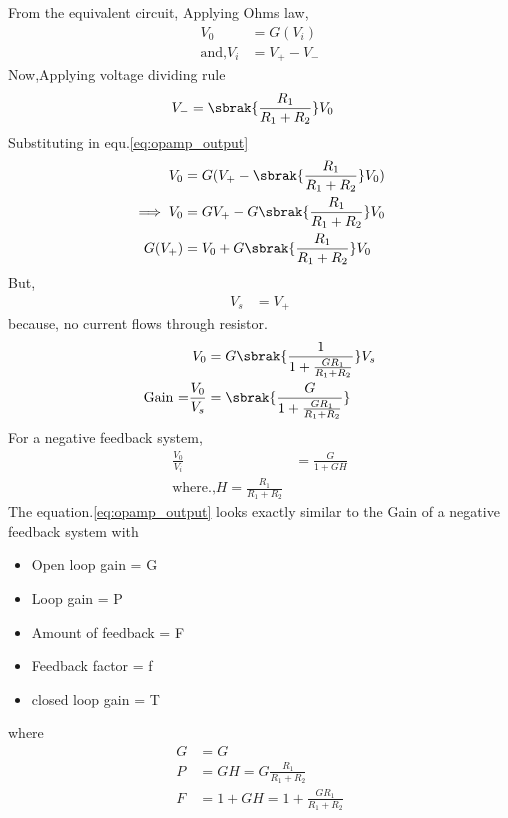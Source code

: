 \begin{enumerate}[label=\thesubsection.\arabic*.,ref=\thesubsection.\theenumi]
\begin{figure}[!ht]
\begin{center}
		\resizebox{\columnwidth}{!}{}
	\end{center}
\caption{}
\label{fig:equivalent_circuit}
\end{figure}
From the equivalent circuit,
Applying Ohms law,
\begin{align}
V_0 &= G(V_i) \label{eq:opamp_output}\\
\text{and,} V_i &= V_+-V_-
\end{align}
Now,Applying voltage dividing rule
\begin{align}
V_- &= \sbrak{\frac{R_1}{R_1+R_2}}V_0
\end{align}
Substituting in equ.\ref{eq:opamp_output}
\begin{align}
    V_0 &= G(V_+-\sbrak{\frac{R_1}{R_1+R_2}}V_0)
    \\
\implies V_0 &= GV_+-G\sbrak{\frac{R_1}{R_1+R_2}}V_0
    \\
G(V_+)&=V_0+G\sbrak{\frac{R_1}{R_1+R_2}}V_0
\end{align}
But,
\begin{align}
    V_s &= V_+
\end{align}
because, no current flows through resistor.  
\begin{align}
    V_0 &= G\sbrak{\frac{1}{1+\frac{GR_1}{R_1+R_2}}}V_s
    \\
 \text{Gain =}\frac{V_0}{V_s}&=\sbrak{\frac{G}{1+\frac{GR_1}{R_1+R_2}}}\label{eq:opamp_gain}
\end{align}
For a negative feedback system,
\begin{align}
   \frac{V_0}{V_i} &= \frac{G}{1+GH}
  \\
  \text{where.,} H = \frac{R_1}{R_1+R_2}
\end{align}
The equation.\ref{eq:opamp_output} looks exactly similar to the Gain of a negative feedback system with
\begin{itemize}
    \item Open loop gain = G
    \item Loop gain = P 
    \item Amount of feedback = F
    \item Feedback factor = f
    \item closed loop gain = T
\end{itemize}
where
\begin{align}
    G &= G\\
    P &= GH = G\frac{R_1}{R_1+R_2}\\
    F &= 1+GH= 1 + \frac{GR_1}{R_1+R_2}\\

\end{align}
\end{enumerate}
